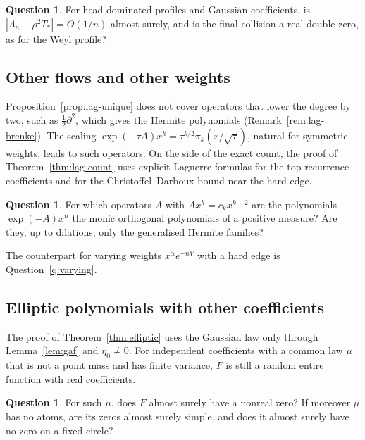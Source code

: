 \documentclass[11pt]{amsart}
\theoremstyle{definition}
\newtheorem{question}[theorem]{Question}
\theoremstyle{remark}
\numberwithin{equation}{section}
\begin{document}
\begin{question}\label{q:head-rate}
For head-dominated profiles and Gaussian coefficients, is $|\Lambda_n-\rho^2T_*|=O(1/n)$ almost surely, and is the final collision a real double zero, as for the Weyl profile?
\end{question}

\subsection{Other flows and other weights}
Proposition~\ref{prop:lag-unique} does not cover operators that lower the degree by two, such as $\frac12\partial^2$, which gives the Hermite polynomials (Remark~\ref{rem:lag-brenke}). The scaling $\exp(-\tau A)x^k=\tau^{k/2}\pi_k(x/\sqrt\tau)$, natural for symmetric weights, leads to such operators. On the side of the exact count, the proof of Theorem~\ref{thm:lag-count} uses explicit Laguerre formulas for the top recurrence coefficients and for the Christoffel--Darboux bound near the hard edge.

\begin{question}\label{q:other-flows}
For which operators $A$ with $Ax^k=c_kx^{k-2}$ are the polynomials $\exp(-A)x^n$ the monic orthogonal polynomials of a positive measure? Are they, up to dilations, only the generalised Hermite families?
\end{question}
The counterpart for varying weights $x^\alpha e^{-nV}$ with a hard edge is Question~\ref{q:varying}.

\subsection{Elliptic polynomials with other coefficients}
The proof of Theorem~\ref{thm:elliptic} uses the Gaussian law only through Lemma~\ref{lem:gaf} and $\eta_0\ne0$. For independent coefficients with a common law $\mu$ that is not a point mass and has finite variance, $F$ is still a random entire function with real coefficients.

\begin{question}\label{q:elliptic-laws}
For such $\mu$, does $F$ almost surely have a nonreal zero? If moreover $\mu$ has no atoms, are its zeros almost surely simple, and does it almost surely have no zero on a fixed circle?
\end{question}
\end{document}
